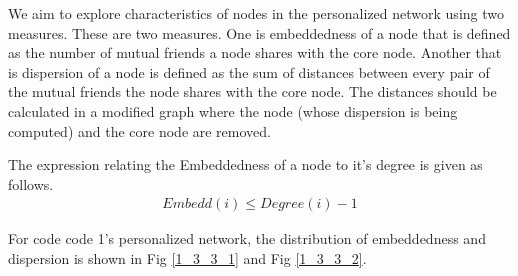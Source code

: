 \documentclass[11pt]{article}
\begin{document}
We aim to explore characteristics of nodes in the personalized network using two measures. These are two measures. One is embeddedness of a node that is defined as the number of mutual friends a node shares with the core node. Another that is dispersion of a node is defined as the sum of distances between every pair of the mutual friends the node shares with the core node. The distances should be calculated in a modified graph where the node (whose dispersion is being computed) and the core node are removed.

The expression relating the Embeddedness of a node to it’s degree is given as follows.
\begin{align}
Embedd(i) \leq Degree (i) - 1
\end{align}

For code code 1’s personalized network, the distribution of embeddedness and dispersion is shown in Fig \ref{1_3_3_1} and Fig \ref{1_3_3_2}.
\end{document}
